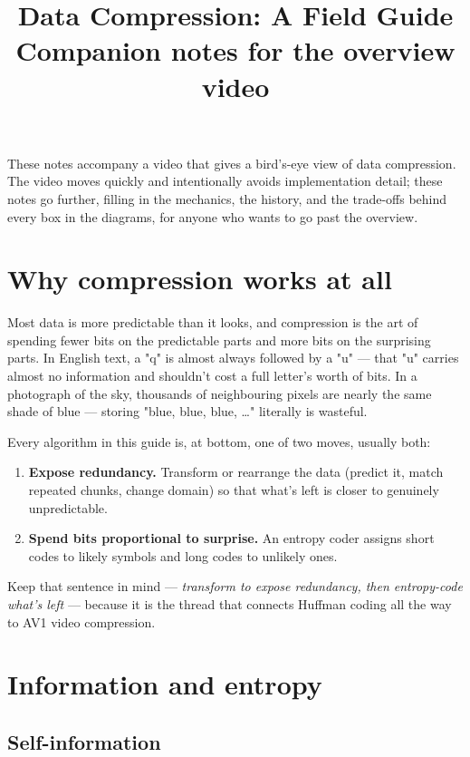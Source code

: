 \documentclass[11pt]{article}
\title{\Large\bfseries Data Compression: A Field Guide\\[4pt]
\large\normalfont Companion notes for the overview video}
\author{}
\date{}
\begin{document}
\maketitle
\vspace{-2em}

\noindent These notes accompany a video that gives a bird's-eye view of data compression. The video moves quickly and intentionally avoids implementation detail; these notes go further, filling in the mechanics, the history, and the trade-offs behind every box in the diagrams, for anyone who wants to go past the overview.

\tableofcontents

\section{Why compression works at all}

Most data is more predictable than it looks, and compression is the art of spending fewer bits on the predictable parts and more bits on the surprising parts. In English text, a "q" is almost always followed by a "u" — that "u" carries almost no information and shouldn't cost a full letter's worth of bits. In a photograph of the sky, thousands of neighbouring pixels are nearly the same shade of blue — storing "blue, blue, blue, \ldots" literally is wasteful.

Every algorithm in this guide is, at bottom, one of two moves, usually both:

\begin{enumerate}[leftmargin=1.4em]
  \item \textbf{Expose redundancy.} Transform or rearrange the data (predict it, match repeated chunks, change domain) so that what's left is closer to genuinely unpredictable.
  \item \textbf{Spend bits proportional to surprise.} An entropy coder assigns short codes to likely symbols and long codes to unlikely ones.
\end{enumerate}

Keep that sentence in mind — \emph{transform to expose redundancy, then entropy-code what's left} — because it is the thread that connects Huffman coding all the way to AV1 video compression.

\section{Information and entropy}

\subsection{Self-information}
\end{document}
